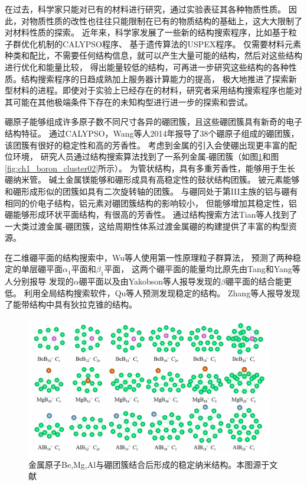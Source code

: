 在过去，科学家只能对已有的材料进行研究，通过实验表征其各种物质性质。
因此，对物质性质的改性也往往只能限制在已有的物质结构的基础上，这大大限制了对材料性质的探索。
近年来，科学家发展了一些新的结构搜索程序，比如基于粒子群优化机制的CALYPSO程序\cite{wang2012calypso}、
基于遗传算法的USPEX程序\cite{glass2006uspex}。
仅需要材料元素种类和配比，不需要任何结构信息，就可以产生大量可能的结构，然后对这些结构进行优化和能量比较，
得出能量较低的结构，可再进一步研究这些结构的各种性质。结构搜索程序的日趋成熟加上服务器计算能力的提高，
极大地推进了探索新型材料的进程。即使对于实验上已经存在的材料，研究者采用结构搜索程序也能对其可能在其他极端条件下存在的未知构型进行进一步的探索和尝试。

硼原子能够组成许多原子数不同尺寸各异的硼团簇，且这些硼团簇具有新奇的电子结构特征。
通过CALYPSO，Wang等人\cite{lv2014b38}2014年报导了38个硼原子组成的硼团簇，该团簇有很好的稳定性和高的芳香性。
考虑到金属的引入会使硼出现更丰富的配位环境，
研究人员通过结构搜索算法找到了一系列金属-硼团簇（如图\ref{fig:ch1_boron_cluster01}和图\ref{fig:ch1_boron_cluster02}所示）。
\cite{dong2019li}为管状结构，具有多重芳香性，能够用于生长硼纳米管。
碱土金属镁能够和硼形成具有高稳定性的鼓状结构团簇\cite{tian2019exhaustive}。
铍元素能够和硼形成形似的团簇如具有二次旋转轴的团簇\cite{kang2019probing}。
与硼同处于第III主族的铝与硼有相同的价电子结构，铝元素对硼团簇结构的影响较小，
但能够增加其稳定性，铝硼能够形成环状平面结构\cite{jin2019structural}，有很高的芳香性。
通过结构搜索方法Tian等人\cite{tian2019cluster}找到了一大类过渡金属-硼团簇，这给周期性体系过渡金属硼的构建提供了丰富的构型资源。

在二维硼平面的结构搜索中，Wu等人\cite{wu2012two}使用第一性原理粒子群算法，
预测了两种稳定的单层硼平面$\alpha_1$平面和$\beta_1$平面，
这两个硼平面的能量均比原先由Tang和Yang等人\cite{tang2007novel,yang2008ab}分别报导
发现的$\alpha$硼平面以及由Yakobson等人\cite{penev2012polymorphism}报导发现的$\beta$硼平面的结合能更低。
利用全局结构搜索软件，Qu等人\cite{qu2017two}预测发现稳定的结构。
Zhang等人\cite{zhang2017dirac}报导发现了能带结构中具有狄拉克锥的结构。

\begin{figure}[bt]
  \includegraphics[width=0.96\textwidth]{figs/ch1_boron_cluster01.png}
  \centering
  \caption{金属原子Be,Mg,Al与硼团簇结合后形成的稳定纳米结构。本图源于文献\cite{tian2019cluster}}
  \label{fig:ch1_boron_cluster01}
\end{figure}

